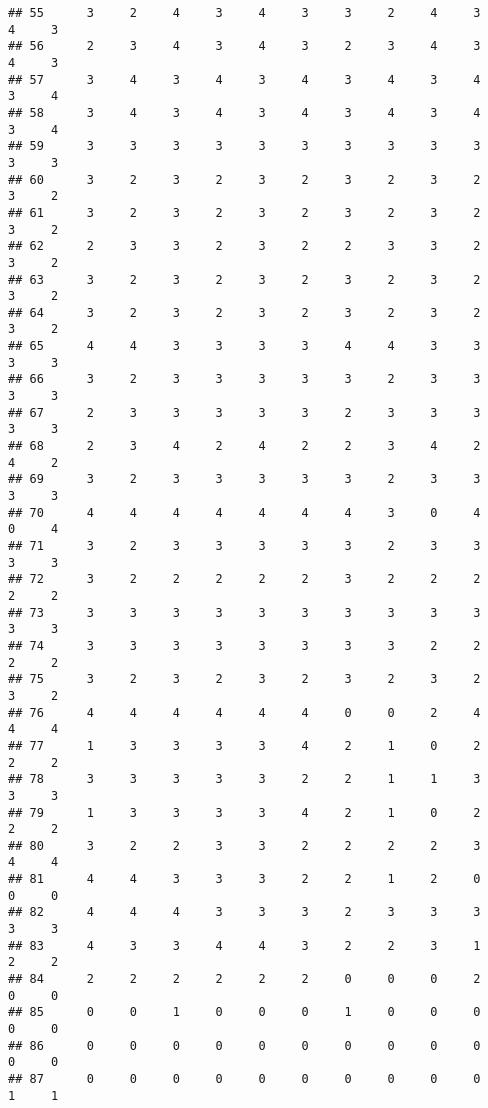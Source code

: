 \documentclass[
]{article}
\begin{document}
\begin{verbatim}
## 55      3     2     4     3     4     3     3     2     4     3     4     3
## 56      2     3     4     3     4     3     2     3     4     3     4     3
## 57      3     4     3     4     3     4     3     4     3     4     3     4
## 58      3     4     3     4     3     4     3     4     3     4     3     4
## 59      3     3     3     3     3     3     3     3     3     3     3     3
## 60      3     2     3     2     3     2     3     2     3     2     3     2
## 61      3     2     3     2     3     2     3     2     3     2     3     2
## 62      2     3     3     2     3     2     2     3     3     2     3     2
## 63      3     2     3     2     3     2     3     2     3     2     3     2
## 64      3     2     3     2     3     2     3     2     3     2     3     2
## 65      4     4     3     3     3     3     4     4     3     3     3     3
## 66      3     2     3     3     3     3     3     2     3     3     3     3
## 67      2     3     3     3     3     3     2     3     3     3     3     3
## 68      2     3     4     2     4     2     2     3     4     2     4     2
## 69      3     2     3     3     3     3     3     2     3     3     3     3
## 70      4     4     4     4     4     4     4     3     0     4     0     4
## 71      3     2     3     3     3     3     3     2     3     3     3     3
## 72      3     2     2     2     2     2     3     2     2     2     2     2
## 73      3     3     3     3     3     3     3     3     3     3     3     3
## 74      3     3     3     3     3     3     3     3     2     2     2     2
## 75      3     2     3     2     3     2     3     2     3     2     3     2
## 76      4     4     4     4     4     4     0     0     2     4     4     4
## 77      1     3     3     3     3     4     2     1     0     2     2     2
## 78      3     3     3     3     3     2     2     1     1     3     3     3
## 79      1     3     3     3     3     4     2     1     0     2     2     2
## 80      3     2     2     3     3     2     2     2     2     3     4     4
## 81      4     4     3     3     3     2     2     1     2     0     0     0
## 82      4     4     4     3     3     3     2     3     3     3     3     3
## 83      4     3     3     4     4     3     2     2     3     1     2     2
## 84      2     2     2     2     2     2     0     0     0     2     0     0
## 85      0     0     1     0     0     0     1     0     0     0     0     0
## 86      0     0     0     0     0     0     0     0     0     0     0     0
## 87      0     0     0     0     0     0     0     0     0     0     1     1

\end{verbatim}
\end{document}
